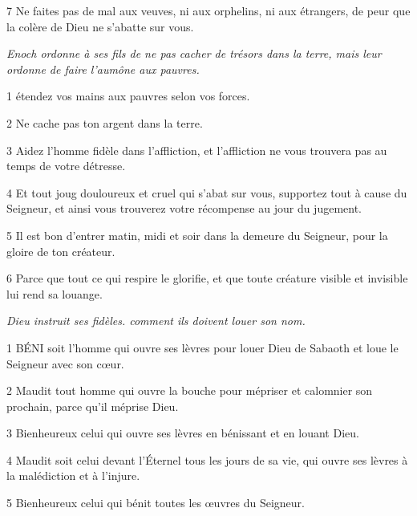 \par 7 Ne faites pas de mal aux veuves, ni aux orphelins, ni aux étrangers, de peur que la colère de Dieu ne s'abatte sur vous.


\par \textit{Enoch ordonne à ses fils de ne pas cacher de trésors dans la terre, mais leur ordonne de faire l'aumône aux pauvres.}

\par 1 étendez vos mains aux pauvres selon vos forces.

\par 2 Ne cache pas ton argent dans la terre.

\par 3 Aidez l'homme fidèle dans l'affliction, et l'affliction ne vous trouvera pas au temps de votre détresse.

\par 4 Et tout joug douloureux et cruel qui s'abat sur vous, supportez tout à cause du Seigneur, et ainsi vous trouverez votre récompense au jour du jugement.

\par 5 Il est bon d'entrer matin, midi et soir dans la demeure du Seigneur, pour la gloire de ton créateur.

\par 6 Parce que tout ce qui respire le glorifie, et que toute créature visible et invisible lui rend sa louange.


\par \textit{Dieu instruit ses fidèles. comment ils doivent louer son nom.}

\par 1 BÉNI soit l'homme qui ouvre ses lèvres pour louer Dieu de Sabaoth et loue le Seigneur avec son cœur.

\par 2 Maudit tout homme qui ouvre la bouche pour mépriser et calomnier son prochain, parce qu'il méprise Dieu.

\par 3 Bienheureux celui qui ouvre ses lèvres en bénissant et en louant Dieu.

\par 4 Maudit soit celui devant l'Éternel tous les jours de sa vie, qui ouvre ses lèvres à la malédiction et à l'injure.

\par 5 Bienheureux celui qui bénit toutes les œuvres du Seigneur.


